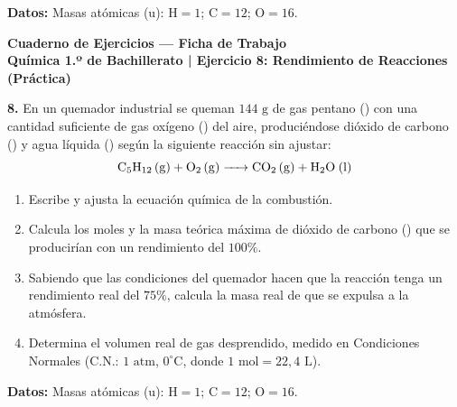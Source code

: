 \documentclass[11pt,a4paper]{article}
\begin{document}
\vspace{0.5cm}
\noindent\textbf{Datos:} Masas atómicas ($\text{u}$): $\mathrm{H} = 1$; $\mathrm{C} = 12$; $\mathrm{O} = 16$.

\newpage

\begin{center}
    {\LARGE \textbf{Cuaderno de Ejercicios — Ficha de Trabajo}}\\[4pt]
    {\large \textbf{Química 1.º de Bachillerato | Ejercicio 8: Rendimiento de Reacciones (Práctica)}}
\end{center}

\vspace{0.8cm}
\noindent\textbf{8.} En un quemador industrial se queman $144\text{ g}$ de gas pentano () con una cantidad suficiente de gas oxígeno () del aire, produciéndose dióxido de carbono () y agua líquida () según la siguiente reacción sin ajustar:
\[
\ce{C5H12 (g) + O2 (g) -> CO2 (g) + H2O (l)}
\]

\begin{enumerate}[label=\textbf{\alph*)}, leftmargin=2em, itemsep=12pt]
    \item Escribe y ajusta la ecuación química de la combustión.
    \item Calcula los moles y la masa teórica máxima de dióxido de carbono () que se producirían con un rendimiento del $100\%$.
    \item Sabiendo que las condiciones del quemador hacen que la reacción tenga un rendimiento real del $75\%$, calcula la masa real de  que se expulsa a la atmósfera.
    \item Determina el volumen real de gas  desprendido, medido en Condiciones Normales ($\text{C.N.}$: $1\text{ atm}$, $0^\circ\text{C}$, donde $1\text{ mol} = 22{,}4\text{ L}$).
\end{enumerate}

\vspace{0.5cm}
\noindent\textbf{Datos:} Masas atómicas ($\text{u}$): $\mathrm{H} = 1$; $\mathrm{C} = 12$; $\mathrm{O} = 16$.
\end{document}
